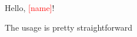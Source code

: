 \documentclass[12pt]{article}
\newcommand{\param}[1]{\textcolor{red}{[#1]}}
\begin{document}
Hello, \param{name}!

The usage is pretty straightforward
\end{document}
